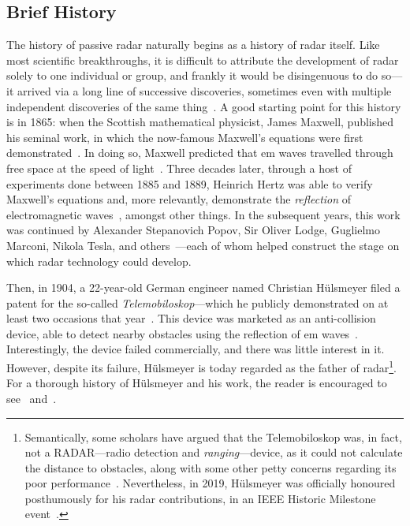 \documentclass[class=report,11pt,crop=false]{standalone}
\begin{document}
\subsection{Brief History}
The history of passive radar naturally begins as a history of radar itself. Like most scientific breakthroughs, it is difficult to attribute the development of radar solely to one individual or group, and frankly it would be disingenuous to do so---it arrived via a long line of successive discoveries, sometimes even with multiple independent discoveries of the same thing~\cite{brown1999technical}. A good starting point for this history is in 1865: when the Scottish mathematical physicist, James Maxwell, published his seminal work, in which the now-famous Maxwell's equations were first demonstrated~\cite{maxwell1865viii}. In doing so, Maxwell predicted that \gls{em} waves travelled through free space at the speed of light~\cite{Sengupta2003}. Three decades later, through a host of experiments done between 1885 and 1889, Heinrich Hertz was able to verify Maxwell's equations and, more relevantly, demonstrate the \emph{reflection} of electromagnetic waves~\cite{hertz1893electromagnetic, Cichon1995}, amongst other things. In the subsequent years, this work was continued by Alexander Stepanovich Popov, Sir Oliver Lodge, Guglielmo Marconi, Nikola Tesla, and others~\cite{Rohling2014, James1989, Griffiths2019}---each of whom helped construct the stage on which radar technology could develop.

Then, in 1904, a 22-year-old German engineer named Christian H\"ulsmeyer filed a patent for the so-called \emph{Telemobiloskop}---which he publicly demonstrated on at least two occasions that year~\cite{Galati2014}. This device was marketed as an anti-collision device, able to detect nearby obstacles using the reflection of \gls{em} waves~\cite{swords1986technical}. Interestingly, the device failed commercially, and there was little interest in it. However, despite its failure, H\"ulsmeyer is today regarded as the father of radar\footnote{Semantically, some scholars have argued that the Telemobiloskop was, in fact, not a RADAR---radio detection and \emph{ranging}---device, as it could not calculate the distance to obstacles, along with some other petty concerns regarding its poor performance~\cite{pritchard1989radar}. Nevertheless, in 2019, H\"ulsmeyer was officially honoured posthumously for his radar contributions, in an IEEE Historic Milestone event~\cite{Griffiths2019}.}. For a thorough history of H\"ulsmeyer and his work, the reader is encouraged to see~\cite{pritchard1989radar} and~\cite{bauer2005christian}.
\end{document}
